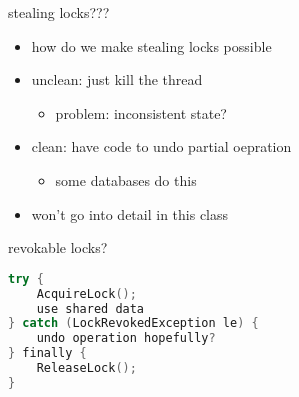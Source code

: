 \begin{frame}{stealing locks???}
    \begin{itemize}
    \item how do we make stealing locks possible
    \vspace{.5cm}
    \item unclean: just kill the thread
        \begin{itemize}
        \item problem: inconsistent state?
        \end{itemize}
    \item clean: have code to undo partial oepration
        \begin{itemize}
        \item some databases do this
        \end{itemize}
    \item won't go into detail in this class
    \end{itemize}
\end{frame}

\begin{frame}[fragile,label=revokeLock]{revokable locks?}
\begin{lstlisting}[language=C++,style=small]
try {
    AcquireLock();
    use shared data
} catch (LockRevokedException le) {
    undo operation hopefully?
} finally {
    ReleaseLock();
}
\end{lstlisting}
\end{frame}

